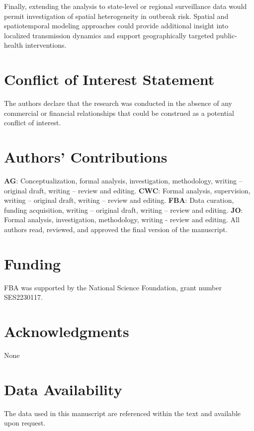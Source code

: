 \documentclass[utf8]{FrontiersinHarvard} %
\begin{document}
Finally, extending the analysis to state-level or regional surveillance data would permit investigation of spatial heterogeneity in outbreak risk. Spatial and spatiotemporal modeling approaches could provide additional insight into localized transmission dynamics and support geographically targeted public-health interventions.


\section*{Conflict of Interest Statement}

The authors declare that the research was conducted in the absence of any commercial or financial relationships that could be construed as a potential conflict of interest.



\section*{Authors' Contributions}
\textbf{AG}: Conceptualization, formal analysis, investigation, methodology, writing – original
draft, writing – review and editing. 
\textbf{CWC}: Formal analysis, supervision, writing – original
draft, writing – review and editing. 
\textbf{FBA}: Data curation, funding acquisition, writing – original
draft, writing – review and editing. 
\textbf{JO}: Formal analysis, investigation, methodology, writing -  review and editing. 
All authors read, reviewed, and approved the final version of the manuscript.

\section*{Funding}
FBA was supported by the
National Science Foundation, grant number SES2230117.%

\section*{Acknowledgments}
None
\section*{Data Availability}
The data used in this manuscript are referenced within the text and available upon request.   


 


\end{document}
